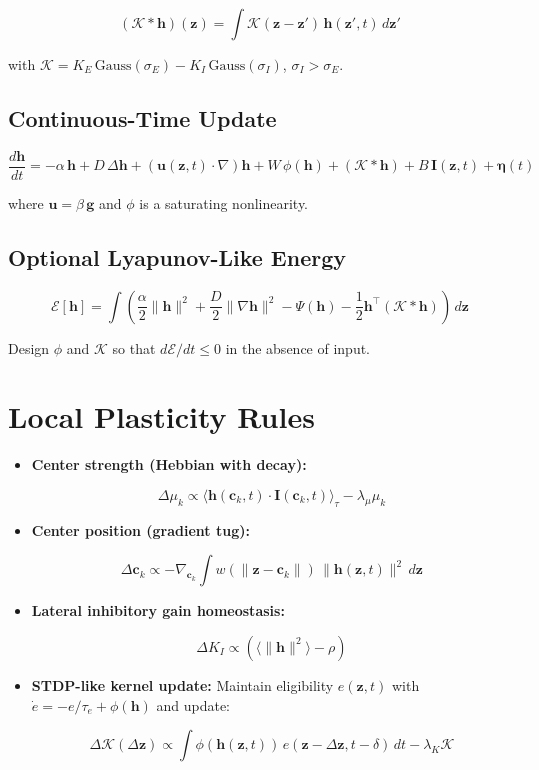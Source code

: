 \documentclass[12pt]{article}
\begin{document}
\[
(\mathcal{K} \ast \mathbf{h})(\mathbf{z}) = \int \mathcal{K}(\mathbf{z}-\mathbf{z}')\,\mathbf{h}(\mathbf{z}',t)\,d\mathbf{z}'
\]


with $\mathcal{K} = K_E\,\mathrm{Gauss}(\sigma_E) - K_I\,\mathrm{Gauss}(\sigma_I)$, $\sigma_I>\sigma_E$.

\subsection{Continuous-Time Update}


\[
\frac{d\mathbf{h}}{dt} = 
-\alpha\,\mathbf{h} +
D\,\Delta \mathbf{h} +
(\mathbf{u}(\mathbf{z}, t)\cdot\nabla)\mathbf{h} +
W\,\phi(\mathbf{h}) + (\mathcal{K}\ast \mathbf{h}) +
B\,\mathbf{I}(\mathbf{z}, t) + \boldsymbol{\eta}(t)
\]


where $\mathbf{u}=\beta\,\mathbf{g}$ and $\phi$ is a saturating nonlinearity.

\subsection{Optional Lyapunov-Like Energy}


\[
\mathcal{E}[\mathbf{h}] = \int \left(\frac{\alpha}{2}\|\mathbf{h}\|^2 + \frac{D}{2}\|\nabla \mathbf{h}\|^2 - \Psi(\mathbf{h}) - \frac{1}{2}\mathbf{h}^\top(\mathcal{K}\ast \mathbf{h})\right)\,d\mathbf{z}
\]


Design $\phi$ and $\mathcal{K}$ so that $d\mathcal{E}/dt \le 0$ in the absence of input.

\section{Local Plasticity Rules}
\begin{itemize}
    \item \textbf{Center strength (Hebbian with decay):}
    

\[
    \Delta \mu_k \propto \langle \mathbf{h}(\mathbf{c}_k,t)\cdot \mathbf{I}(\mathbf{c}_k,t) \rangle_\tau - \lambda_\mu \mu_k
    \]


    \item \textbf{Center position (gradient tug):}
    

\[
    \Delta \mathbf{c}_k \propto -\nabla_{\mathbf{c}_k} \int w(\|\mathbf{z}-\mathbf{c}_k\|)\,\|\mathbf{h}(\mathbf{z},t)\|^2\, d\mathbf{z}
    \]


    \item \textbf{Lateral inhibitory gain homeostasis:}
    

\[
    \Delta K_I \propto \left(\langle \|\mathbf{h}\|^2 \rangle - \rho\right)
    \]


    \item \textbf{STDP-like kernel update:} Maintain eligibility $e(\mathbf{z},t)$ with $\dot e = -e/\tau_e + \phi(\mathbf{h})$ and update:
    

\[
    \Delta \mathcal{K}(\Delta \mathbf{z}) \propto 
    \int \phi(\mathbf{h}(\mathbf{z},t))\, e(\mathbf{z}-\Delta\mathbf{z}, t - \delta)\,dt - \lambda_K \mathcal{K}
    \]


\end{itemize}
\end{document}
